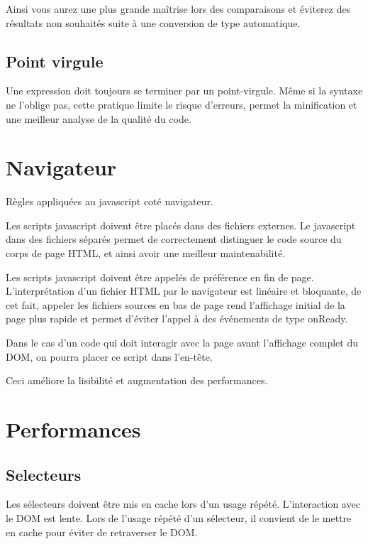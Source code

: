 			Ainsi vous aurez une plus grande maîtrise lors des comparaisons et éviterez des résultats non souhaités suite à une conversion de type automatique.

		\subsection{Point virgule}
			Une expression doit toujours se terminer par un point-virgule. Même si la syntaxe ne l'oblige pas, cette pratique limite le risque d'erreurs, permet la minification et une meilleur analyse de la qualité du code.

	\section{Navigateur}
		Règles appliquées au javascript coté navigateur.

		Les scripts javascript doivent être placés dans des fichiers externes. Le javascript dans des fichiers séparés permet de correctement distinguer le code source du corps de page HTML, et ainsi avoir une meilleur maintenabilité.

		Les scripts javascript doivent être appelés de préférence en fin de page. L'interprétation d'un fichier HTML par le navigateur est linéaire et bloquante, de cet fait, appeler les fichiers sources en bas de page rend l’affichage initial de la page plus rapide et permet d'éviter l'appel à des événements de type onReady.

		Dans le cas d'un code qui doit interagir avec la page avant l’affichage complet du DOM, on pourra placer ce script dans l'en-tête.

		Ceci améliore la lisibilité et augmentation des performances.

	\section{Performances}
		\subsection{Selecteurs}
			Les sélecteurs doivent être mis en cache lors d'un usage répété. L'interaction avec le DOM est lente. Lors de l'usage répété d'un sélecteur, il convient de le mettre en cache pour éviter de retraverser le DOM.

